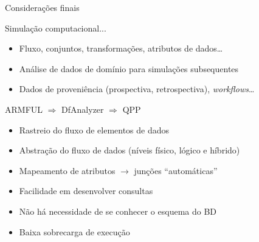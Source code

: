 \documentclass[12pt,compress,final]{beamer}
\newcommand{\nologo}{\setbeamertemplate{logo}{}} %
\begin{document}
{\nologo
\begin{frame}[t,squeeze]{Considerações finais}

\footnotesize


\begin{block}{Simulação computacional...}
\begin{itemize}
\item Fluxo, conjuntos, transformações, atributos de dados\ldots{}
\item Análise de dados de domínio para simulações subsequentes
\item Dados de proveniência (prospectiva, retrospectiva), \textit{workflows}\ldots{}
\end{itemize}
\end{block}

\vfill

\begin{alertblock}{ARMFUL $\Rightarrow$ DfAnalyzer $\Rightarrow$ QPP}
\begin{itemize}
\item \alert{Rastreio} do fluxo de elementos de dados
\item \alert{Abstração} do fluxo de dados (níveis físico, lógico e híbrido)
\item Mapeamento de atributos $\rightarrow$ \alert{junções ``automáticas''}
\item \alert{Facilidade} em desenvolver consultas
\item Não há necessidade de se conhecer o esquema do BD
\item Baixa sobrecarga de execução
\end{itemize}
\end{alertblock}

\end{frame}
}

\end{document}
